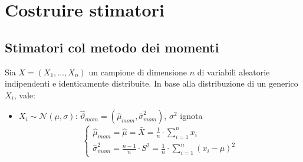 \documentclass[12pt, a4paper]{report}
\theoremstyle{definition}
\begin{document}
\section{Costruire stimatori}
\subsection{Stimatori col metodo dei momenti}
Sia $X=(X_1,\dots,X_n)$ un campione di dimensione $n$ di variabili aleatorie
indipendenti e identicamente distribuite. In base alla distribuzione di un
generico $X_i$, vale:
\begin{itemize}
    \item $X_i\sim\mathcal{N}(\mu,\sigma)$:
    $\hat{\vartheta}_{mom}=(\hat{\mu}_{mom},\hat{\sigma}^2_{mom})$,
    $\sigma^2$ ignota
    \[\begin{cases}
        \hat{\mu}_{mom}=\hat{\mu}=\bar{X}=\frac{1}{n}\cdot\sum_{i=1}^n x_i\\
        \hat{\sigma}^2_{mom}=\frac{n-1}{n}\cdot S^2=\frac{1}{n}\cdot\sum_{i=1}^n
        (x_i-\mu)^2
    \end{cases}\]
\end{itemize}
\end{document}
